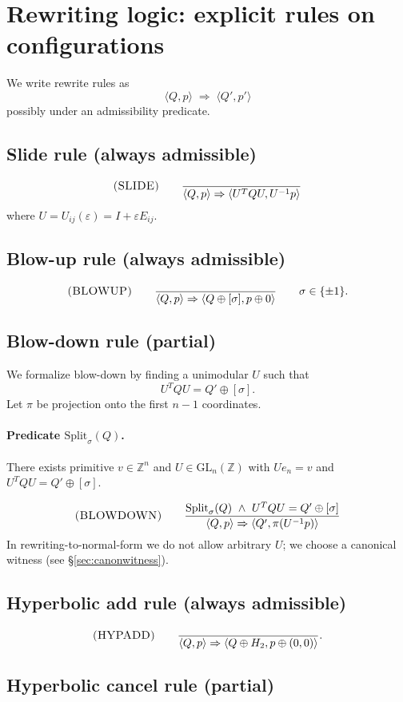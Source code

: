 \documentclass[11pt]{article}
\newcommand{\ZZ}{\mathbb{Z}}
\newcommand{\GL}{\mathrm{GL}}
\newcommand{\proj}{\pi}
\newcommand{\cfg}[2]{\langle #1,#2\rangle}
\newcommand{\Rule}[1]{\textsc{(#1)}}
\begin{document}
\section{Rewriting logic: explicit rules on configurations}

We write rewrite rules as
\[
\cfg{Q}{p}\;\Rightarrow\;\cfg{Q'}{p'}
\]
possibly under an admissibility predicate.

\subsection{Slide rule (always admissible)}
\[
\Rule{SLIDE}\qquad
\frac{}{\cfg{Q}{p}\Rightarrow \cfg{U^T Q U}{U^{-1}p}}
\]
where $U=U_{ij}(\varepsilon)=I+\varepsilon E_{ij}$.

\subsection{Blow-up rule (always admissible)}
\[
\Rule{BLOWUP}\qquad
\frac{}{\cfg{Q}{p}\Rightarrow \cfg{Q\oplus[\sigma]}{p\oplus 0}}
\qquad \sigma\in\{\pm1\}.
\]

\subsection{Blow-down rule (partial)}\label{sec:blowdown}
We formalize blow-down by finding a unimodular $U$ such that
\[
U^T Q U = Q'\oplus[\sigma].
\]
Let $\proj$ be projection onto the first $n-1$ coordinates.

\paragraph{Predicate $\mathrm{Split}_\sigma(Q)$.}
There exists primitive $v\in \ZZ^n$ and $U\in \GL_n(\ZZ)$ with $Ue_n=v$ and $U^T Q U=Q'\oplus[\sigma]$.

\[
\Rule{BLOWDOWN}\qquad
\frac{\mathrm{Split}_\sigma(Q)\ \wedge\ U^TQU=Q'\oplus[\sigma]}{\cfg{Q}{p}\Rightarrow \cfg{Q'}{\proj(U^{-1}p)}}
\]
In rewriting-to-normal-form we do not allow arbitrary $U$; we choose a canonical witness (see \S\ref{sec:canonwitness}).

\subsection{Hyperbolic add rule (always admissible)}
\[
\Rule{HYPADD}\qquad
\frac{}{\cfg{Q}{p}\Rightarrow \cfg{Q\oplus H_2}{p\oplus(0,0)}}.
\]

\subsection{Hyperbolic cancel rule (partial)}\label{sec:hypsplit}
\end{document}
